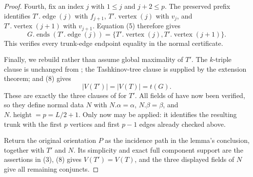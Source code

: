 \begin{proof}
Fourth, fix an index $j$ with $1\le j$ and $j+2\le p$.  The preserved
prefix identifies $T'.\operatorname{edge}(j)$ with $f_{j+1}$,
$T'.\operatorname{vertex}(j)$ with $v_j$, and
$T'.\operatorname{vertex}(j+1)$ with $v_{j+1}$.  Equation (5) therefore
gives
\[
 G.\operatorname{ends}(T'.\operatorname{edge}(j))
 =\{T'.\operatorname{vertex}(j),T'.\operatorname{vertex}(j+1)\}.
\]
This verifies every trunk-edge endpoint equality in the normal
certificate.

Finally, we rebuild rather than assume global maximality of $T'$.  The
$k$-triple clause is unchanged from ; the
Tashkinov-tree clause is supplied by the extension theorem; and (8) gives
\[
 |V(T')|=|V(T)|=t(G).
\]
These are exactly the three clauses of  for
$T'$.  All fields of  have now been
verified, so they define normal data $N$ with
$N.\alpha=\alpha$, $N.\beta=\beta$, and
$N.\operatorname{height}=p=L/2+1$.  Only now may
 be applied: it identifies the resulting trunk
with the first $p$ vertices and first $p-1$ edges already checked above.

Return the original orientation $P$ as the incidence path in the lemma's
conclusion, together with $T'$ and $N$.  Its simplicity and exact full
component support are the assertions in (3), (8) gives
$V(T')=V(T)$, and the three displayed fields of $N$ give all remaining
conjuncts.
\end{proof}
